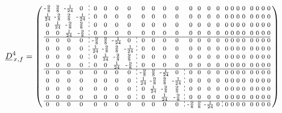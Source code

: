 \documentclass[pdftex,a4paper,parskip,listof=totoc,bibliography=totoc,onehalfspacing,12pt]{scrreprt}
\newcommand*\dashline{\hspace{-0.3em}\rotatebox[origin=c]{90}{\scalebox{-0.3}[1]{$-~~-$}}\hspace{-0.3em}}
\begin{document}
\begin{align*}
	\underline{D}_{\,x,f}^4 &= \begin{psmallmatrix}
\text{-}\frac{9}{8} & \frac{9}{8} & \text{-}\frac{1}{24} & 0 &\dashline& 0 & 0 & 0 & 0 && 0 & 0 & 0 & 0 && 0 & 0 & 0 & 0 && 0 & 0 & 0 & 0 && 0 & 0 & 0 & 0 \\
\frac{1}{24} & \text{-}\frac{9}{8} & \frac{9}{8} & \text{-}\frac{1}{24} &\dashline& 0 & 0 & 0 & 0 && 0 & 0 & 0 & 0 && 0 & 0 & 0 & 0 && 0 & 0 & 0 & 0 && 0 & 0 & 0 & 0 \\
0 & \frac{1}{24} & \text{-}\frac{9}{8} & \frac{9}{8} &\dashline& 0 & 0 & 0 & 0 && 0 & 0 & 0 & 0 && 0 & 0 & 0 & 0 && 0 & 0 & 0 & 0 && 0 & 0 & 0 & 0 \\
0 & 0 & \frac{1}{24} & \text{-}\frac{9}{8} &\dashline& 0 & 0 & 0 & 0 && 0 & 0 & 0 & 0 && 0 & 0 & 0 & 0 && 0 & 0 & 0 & 0 && 0 & 0 & 0 & 0 \\\hline
0 & 0 & 0 & 0 &\dashline& \text{-}\frac{9}{8} & \frac{9}{8} & \text{-}\frac{1}{24} & 0 &\dashline& 0 & 0 & 0 & 0 && 0 & 0 & 0 & 0 && 0 & 0 & 0 & 0 && 0 & 0 & 0 & 0 \\
0 & 0 & 0 & 0 &\dashline& \frac{1}{24} & \text{-}\frac{9}{8} & \frac{9}{8} & \text{-}\frac{1}{24} &\dashline& 0 & 0 & 0 & 0 && 0 & 0 & 0 & 0 && 0 & 0 & 0 & 0 && 0 & 0 & 0 & 0 \\
0 & 0 & 0 & 0 &\dashline& 0 & \frac{1}{24} & \text{-}\frac{9}{8} & \frac{9}{8} &\dashline& 0 & 0 & 0 & 0 && 0 & 0 & 0 & 0 && 0 & 0 & 0 & 0 && 0 & 0 & 0 & 0 \\
0 & 0 & 0 & 0 &\dashline& 0 & 0 & \frac{1}{24} & \text{-}\frac{9}{8} &\dashline& 0 & 0 & 0 & 0 && 0 & 0 & 0 & 0 && 0 & 0 & 0 & 0 && 0 & 0 & 0 & 0 \\\hline
0 & 0 & 0 & 0 && 0 & 0 & 0 & 0 &\dashline& \text{-}\frac{9}{8} & \frac{9}{8} & \text{-}\frac{1}{24} & 0 &\dashline& 0 & 0 & 0 & 0 && 0 & 0 & 0 & 0 && 0 & 0 & 0 & 0 \\
0 & 0 & 0 & 0 && 0 & 0 & 0 & 0 &\dashline& \frac{1}{24} & \text{-}\frac{9}{8} & \frac{9}{8} & \text{-}\frac{1}{24} &\dashline& 0 & 0 & 0 & 0 && 0 & 0 & 0 & 0 && 0 & 0 & 0 & 0 \\
0 & 0 & 0 & 0 && 0 & 0 & 0 & 0 &\dashline& 0 & \frac{1}{24} & \text{-}\frac{9}{8} & \frac{9}{8} &\dashline& 0 & 0 & 0 & 0 && 0 & 0 & 0 & 0 && 0 & 0 & 0 & 0 \\
0 & 0 & 0 & 0 && 0 & 0 & 0 & 0 &\dashline& 0 & 0 & \frac{1}{24} & \text{-}\frac{9}{8} &\dashline& 0 & 0 & 0 & 0 && 0 & 0 & 0 & 0 && 0 & 0 & 0 & 0 \\\hline
0 & 0 & 0 & 0 && 0 & 0 & 0 & 0 && 0 & 0 & 0 & 0 &\dashline& \text{-}\frac{9}{8} & \frac{9}{8} & \text{-}\frac{1}{24} & 0 &\dashline& 0 & 0 & 0 & 0 && 0 & 0 & 0 & 0 \\

\end{psmallmatrix}
\end{align*}
\end{document}

